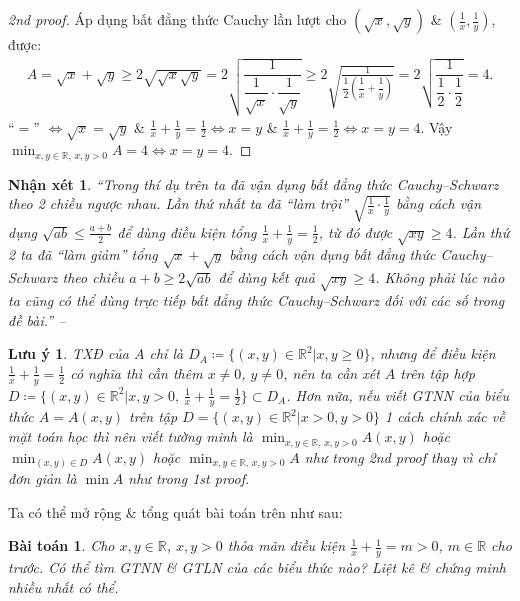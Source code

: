 \documentclass{article}
\newtheorem{baitoan}{Bài toán}
\newtheorem{luuy}{Lưu ý}
\newtheorem{nhanxet}{Nhận xét}
\begin{document}
\begin{proof}[2nd proof]
	Áp dụng bất đẳng thức Cauchy lần lượt cho $(\sqrt{x},\sqrt{y})$ \& $\left(\frac{1}{x},\frac{1}{y}\right)$, được:
	\begin{align*}
		A = \sqrt{x} + \sqrt{y}\ge2\sqrt{\sqrt{x}\sqrt{y}} = 2\sqrt{\dfrac{1}{\dfrac{1}{\sqrt{x}}\cdot\dfrac{1}{\sqrt{y}}}}\ge2\sqrt{\frac{1}{\dfrac{1}{2}\left(\dfrac{1}{x} + \dfrac{1}{y}\right)}} = 2\sqrt{\dfrac{1}{\dfrac{1}{2}\cdot\dfrac{1}{2}}} = 4.
	\end{align*}
	``$=$'' $\Leftrightarrow \sqrt{x} = \sqrt{y}$ \& $\frac{1}{x} + \frac{1}{y} = \frac{1}{2}\Leftrightarrow x = y$ \& $\frac{1}{x} + \frac{1}{y} = \frac{1}{2}\Leftrightarrow x = y = 4$. Vậy $\min_{x,y\in\mathbb{R},\,x,y > 0} A = 4\Leftrightarrow x = y = 4$.
\end{proof}

\begin{nhanxet}
	``Trong thí dụ trên ta đã vận dụng bất đẳng thức Cauchy--Schwarz theo 2 chiều ngược nhau. Lần thứ nhất ta đã ``làm trội'' $\sqrt{\frac{1}{x}\cdot\frac{1}{y}}$ bằng cách vận dụng $\sqrt{ab}\le\frac{a + b}{2}$ để dùng điều kiện tổng $\frac{1}{x} + \frac{1}{y} = \frac{1}{2}$, từ đó được $\sqrt{xy}\ge4$. Lần thứ 2 ta đã ``làm giảm'' tổng $\sqrt{x} + \sqrt{y}$ bằng cách vận dụng bất đẳng thức Cauchy--Schwarz theo chiều $a + b\ge2\sqrt{ab}$ để dùng kết quả $\sqrt{xy}\ge4$. Không phải lúc nào ta cũng có thể dùng trực tiếp bất đẳng thức Cauchy--Schwarz đối với các số trong đề bài.'' -- \emph{\cite[p. 24]{Tuyen_Toan_9}}
\end{nhanxet}

\begin{luuy}
	TXĐ của $A$ chỉ là $D_A\coloneqq\{(x,y)\in\mathbb{R}^2|x,y\ge0\}$, nhưng để điều kiện $\frac{1}{x} + \frac{1}{y} = \frac{1}{2}$ có nghĩa thì cần thêm $x\ne0$, $y\ne0$, nên ta cần xét $A$ trên tập hợp $D\coloneqq\{(x,y)\in\mathbb{R}^2|x,y > 0,\,\frac{1}{x} + \frac{1}{y} = \frac{1}{2}\}\subset D_A$. Hơn nữa, nếu viết {\rm GTNN} của biểu thức $A = A(x,y)$ trên tập $D = \{(x,y)\in\mathbb{R}^2|x > 0,y > 0\}$ 1 cách chính xác về mặt toán học thì nên viết tường minh là $\min_{x,y\in\mathbb{R},\,x,y > 0} A(x,y)$ hoặc $\min_{(x,y)\in D} A(x,y)$ hoặc $\min_{x,y\in\mathbb{R},\,x,y > 0} A$ như trong 2nd proof thay vì chỉ đơn giản là $\min A$ như trong 1st proof.
\end{luuy}
Ta có thể mở rộng \& tổng quát bài toán trên như sau:

\begin{baitoan}
	Cho $x,y\in\mathbb{R}$, $x,y > 0$ thỏa mãn điều kiện $\frac{1}{x} + \frac{1}{y} = m > 0$, $m\in\mathbb{R}$ cho trước. Có thể tìm {\rm GTNN} \& {\rm GTLN} của các biểu thức nào? Liệt kê \& chứng minh nhiều nhất có thể.
\end{baitoan}
\end{document}
